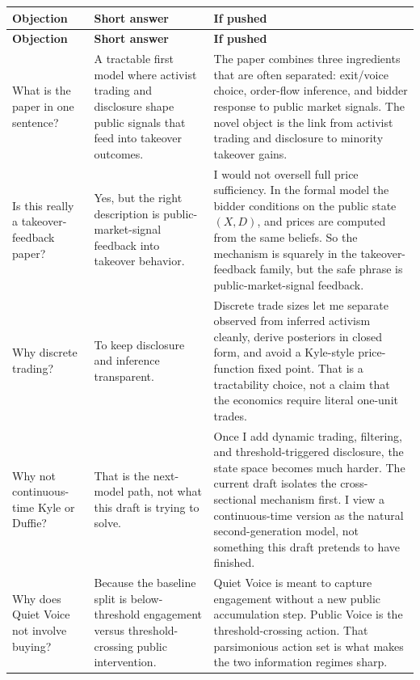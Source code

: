 \documentclass[9pt,a4paper]{extarticle}
\begin{document}
{\footnotesize
\begin{longtable}{@{}P{0.24\textwidth}P{0.22\textwidth}P{0.48\textwidth}@{}}
\toprule
\textbf{Objection} & \textbf{Short answer} & \textbf{If pushed} \\
\midrule
\endfirsthead
\toprule
\textbf{Objection} & \textbf{Short answer} & \textbf{If pushed} \\
\midrule
\endhead
What is the paper in one sentence? &
A tractable first model where activist trading and disclosure shape public signals that feed into takeover outcomes. &
The paper combines three ingredients that are often separated: exit/voice choice, order-flow inference, and bidder response to public market signals. The novel object is the link from activist trading and disclosure to minority takeover gains. \\

Is this really a takeover-feedback paper? &
Yes, but the right description is public-market-signal feedback into takeover behavior. &
I would not oversell full price sufficiency. In the formal model the bidder conditions on the public state $(X,D)$, and prices are computed from the same beliefs. So the mechanism is squarely in the takeover-feedback family, but the safe phrase is public-market-signal feedback. \\

Why discrete trading? &
To keep disclosure and inference transparent. &
Discrete trade sizes let me separate observed from inferred activism cleanly, derive posteriors in closed form, and avoid a Kyle-style price-function fixed point. That is a tractability choice, not a claim that the economics require literal one-unit trades. \\

Why not continuous-time Kyle or Duffie? &
That is the next-model path, not what this draft is trying to solve. &
Once I add dynamic trading, filtering, and threshold-triggered disclosure, the state space becomes much harder. The current draft isolates the cross-sectional mechanism first. I view a continuous-time version as the natural second-generation model, not something this draft pretends to have finished. \\

Why does Quiet Voice not involve buying? &
Because the baseline split is below-threshold engagement versus threshold-crossing public intervention. &
Quiet Voice is meant to capture engagement without a new public accumulation step. Public Voice is the threshold-crossing action. That parsimonious action set is what makes the two information regimes sharp. \\


\end{longtable}}
\end{document}

